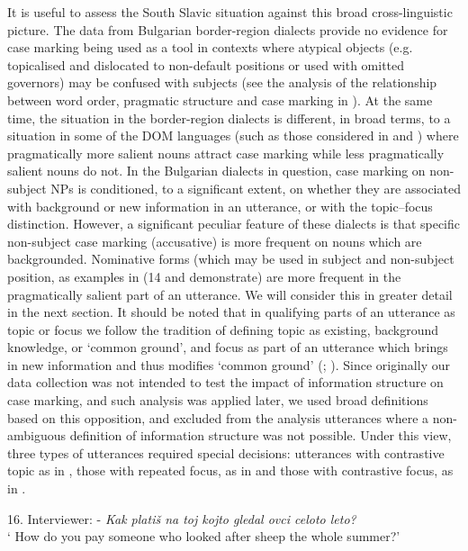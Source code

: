 \documentclass[output=paper]{langscibook}
\begin{document}
It is useful to assess the South Slavic situation against this broad cross-linguistic picture. The data from Bulgarian border-region dialects provide no evidence for case marking being used as a tool in contexts where atypical objects (e.g. topicalised and dislocated to non-default positions or used with omitted governors) may be confused with subjects (see the analysis of the relationship between word order, pragmatic structure and case marking in ). At the same time, the situation in the border-region dialects is different, in broad terms, to a situation in some of the DOM languages (such as those considered in \citealt{Aissen2003} and \citealt{Malchukov2008}) where pragmatically more salient nouns attract case marking while less pragmatically salient nouns do not. In the Bulgarian dialects in question, case marking on non-subject NPs is conditioned, to a significant extent, on whether they are associated with background or new information in an utterance, or with the topic–focus distinction. However, a significant peculiar feature of these dialects is that specific non-subject case marking (accusative) is more frequent on nouns which are backgrounded. Nominative forms (which may be used in subject and non-subject position, as examples in (14 and  demonstrate) are more frequent in the pragmatically salient part of an utterance. We will consider this in greater detail in the next section. It should be noted that in qualifying parts of an utterance as topic or focus we follow the tradition of defining topic as existing, background knowledge, or ‘common ground’, and focus as part of an utterance which brings in new information and thus modifies ‘common ground’ (\citealt{HoopSwart2000}; \citealt{Krifka2007}). Since originally our data collection was not intended to test the impact of information structure on case marking, and such analysis was applied later, we used broad definitions based on this opposition, and excluded from the analysis utterances where a non-ambiguous definition of information structure was not possible. Under this view, three types of utterances required special decisions: utterances with contrastive topic as in , those with repeated focus, as in  and those with contrastive focus, as in . 

16. Interviewer:   {}- \textit{Kak platiš na toj kojto gledal ovci celoto leto?}\\
                                   ‘ How do you pay someone who looked after sheep the whole summer?’
\end{document}
